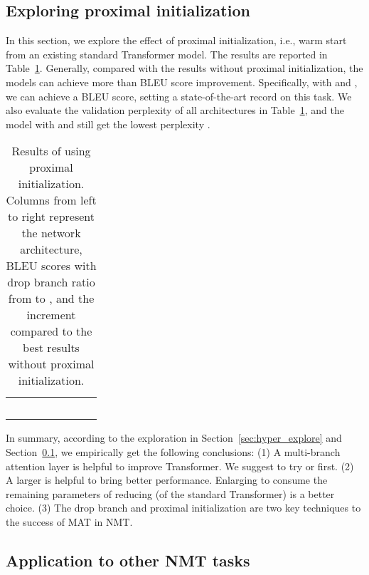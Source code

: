\documentclass{article}
\begin{document}
\subsection{Exploring proximal initialization}\label{sec:proximal_init}
In this section, we explore the effect of proximal initialization, i.e., warm start from an existing standard Transformer model. The results are reported in Table~\ref{tab:result_iwslt_deen}. Generally, compared with the results without proximal initialization, the models can achieve more than  BLEU score improvement. Specifically, with  and , we can achieve a  BLEU score, setting a state-of-the-art record on this task. We also evaluate the validation perplexity of all architectures in Table~\ref{tab:result_iwslt_deen}, and the model with  and  still get the lowest perplexity .

\begin{table}[!htbp]
\vspace{-2mm}
\centering
\caption{Results of using proximal initialization. Columns from left to right represent the network architecture, BLEU scores with drop branch ratio  from  to , and the increment compared to the best results without proximal initialization.}
\begin{tabular}{cccccccc}
\toprule
&     &    &    &     &    \\
\midrule
 &   &	 &  &   &  \\
 &   &		&  &	  &  \\
 &   &		&  &	  &  \\
 &   &		&  &	  &  \\
 &   &		&  &	  &  \\
\bottomrule
\end{tabular}
\label{tab:result_iwslt_deen}
\vspace{-1mm}
\end{table}

In summary, according to the exploration in Section~\ref{sec:hyper_explore} and Section~\ref{sec:proximal_init}, we empirically get the following conclusions: (1) A multi-branch attention layer is helpful to improve Transformer. We suggest to try  or  first. (2) A larger  is helpful to bring better performance. Enlarging  to consume the remaining parameters of reducing  (of the standard Transformer) is a better choice. (3) The drop branch and proximal initialization are two key techniques to the success of MAT in NMT.

\subsection{Application to other NMT tasks}\label{sec:results_apply}
\end{document}
